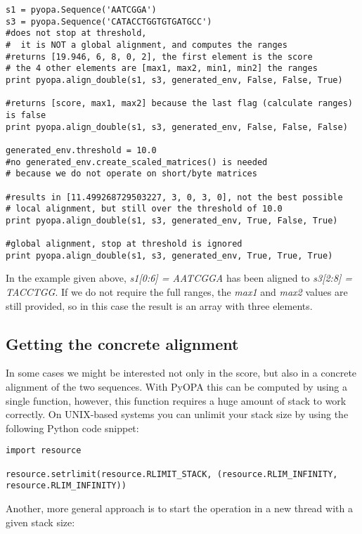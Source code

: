 \documentclass[12pt]{article}
\newcommand{\pp}{PyOPA}
\begin{document}
\begin{lstlisting}
s1 = pyopa.Sequence('AATCGGA')
s3 = pyopa.Sequence('CATACCTGGTGTGATGCC')
#does not stop at threshold,
#  it is NOT a global alignment, and computes the ranges
#returns [19.946, 6, 8, 0, 2], the first element is the score
# the 4 other elements are [max1, max2, min1, min2] the ranges
print pyopa.align_double(s1, s3, generated_env, False, False, True)

#returns [score, max1, max2] because the last flag (calculate ranges) is false
print pyopa.align_double(s1, s3, generated_env, False, False, False)

generated_env.threshold = 10.0
#no generated_env.create_scaled_matrices() is needed
# because we do not operate on short/byte matrices

#results in [11.499268729503227, 3, 0, 3, 0], not the best possible
# local alignment, but still over the threshold of 10.0
print pyopa.align_double(s1, s3, generated_env, True, False, True)

#global alignment, stop at threshold is ignored
print pyopa.align_double(s1, s3, generated_env, True, True, True)
\end{lstlisting}

In the example given above, \emph{s1[0:6] = AATCGGA} has been aligned to \emph{s3[2:8] = TACCTGG}. If we do not require the full ranges, the \emph{max1} and \emph{max2} values are still provided, so in this case the result is an array with three elements.

\subsection{Getting the concrete alignment}
\label{subsec:concrete}

In some cases we might be interested not only in the score, but also in a concrete alignment of the two sequences. With \pp{} this can be computed by using a single function, however, this function requires a huge amount of stack to work correctly. On UNIX-based systems you can unlimit your stack size by using the following Python code snippet:
\begin{lstlisting}
import resource

resource.setrlimit(resource.RLIMIT_STACK, (resource.RLIM_INFINITY, resource.RLIM_INFINITY))
\end{lstlisting}

Another, more general approach is to start the operation in a new thread with a given stack size:
\end{document}
